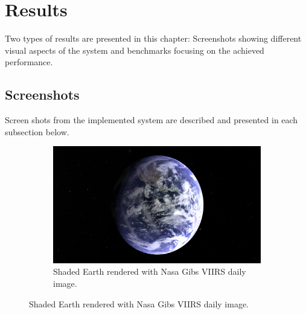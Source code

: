 \chapter{Results}
\label{chapter:results}
Two types of results are presented in this chapter: Screenshots showing different visual aspects of the system and benchmarks focusing on the achieved performance.

\section{Screenshots}
Screen shots from the implemented system are described and presented in each subsection below.

\begin{figure}[h]
  \centering
  \begin{subfigure}[bt]{0.9\textwidth}
    \includegraphics[width=\textwidth]{figures/results/screenshots/specular_earth.png}
    \caption{Shaded Earth rendered with Nasa Gibs VIIRS daily image.}
  \end{subfigure}
\end{figure}

\clearpage
